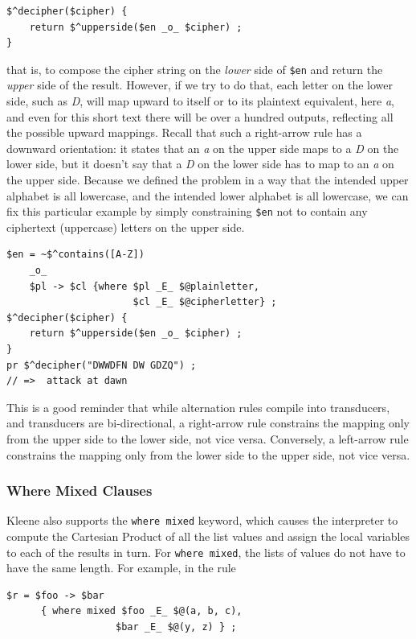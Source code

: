 \begin{Verbatim}
$^decipher($cipher) {
    return $^upperside($en _o_ $cipher) ;
}
\end{Verbatim}

\noindent
that is, to compose the cipher string on the \emph{lower} side of \verb!$en! and return the \emph{upper} side of the
result.  However, if we try to do that, each letter on the lower side, such as \emph{D}, will map upward to itself or to its
plaintext equivalent, here \emph{a}, and even for this short text there will be over a hundred outputs, reflecting all the
possible upward mappings.  Recall that such
a right-arrow rule has a downward orientation:  it states that an \emph{a} on the upper side maps to a \emph{D} on the
lower side, but it doesn't say that a \emph{D} on the lower side has to map to an \emph{a} on the upper side.  Because we
defined the problem in a way that the intended upper alphabet is all lowercase, and the intended lower alphabet is all
lowercase, we can fix
this particular example by simply constraining \verb!$en! not to contain any ciphertext (uppercase) letters on the upper side.

\begin{Verbatim}
$en = ~$^contains([A-Z])
	_o_
	$pl -> $cl {where $pl _E_ $@plainletter,
                      $cl _E_ $@cipherletter} ;
$^decipher($cipher) {
    return $^upperside($en _o_ $cipher) ;
}
pr $^decipher("DWWDFN DW GDZQ") ;
// =>  attack at dawn
\end{Verbatim}

\noindent
This is a good reminder that while alternation rules compile into transducers, and transducers are bi-directional, a
right-arrow rule constrains the mapping only from the upper side to the
lower side, not vice versa.  Conversely, a left-arrow rule constrains
the mapping only from the lower side to the upper side, not vice versa.


\subsubsection{Where Mixed Clauses}

Kleene also supports the \texttt{where mixed} keyword, which causes the interpreter to compute the Cartesian Product
of all the list values and assign the local variables to each of the
results in turn.  For \texttt{where mixed}, the lists of values do not have
to have the same length.  For example, in the rule

\begin{Verbatim}
$r = $foo -> $bar 
      { where mixed $foo _E_ $@(a, b, c), 
	               $bar _E_ $@(y, z) } ;
\end{Verbatim}

